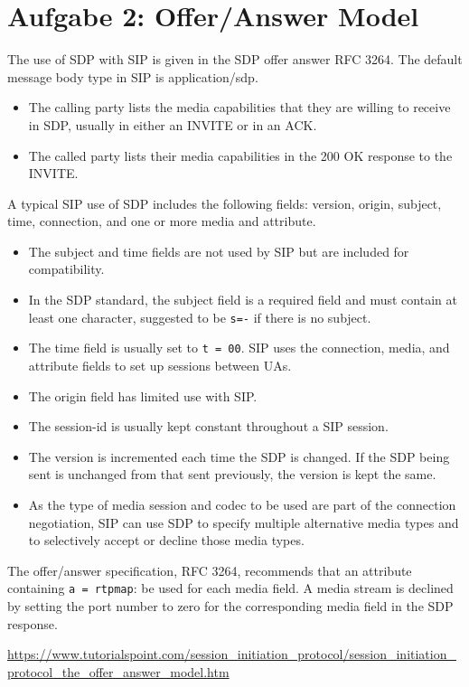 \documentclass{article}
\begin{document}
	\section*{Aufgabe 2: Offer/Answer Model}
	The use of SDP with SIP is given in the SDP offer answer RFC 3264. The default message body type in SIP is application/sdp.
	\begin{itemize}
		\item The calling party lists the media capabilities that they are willing to receive in SDP, usually in either an INVITE or in an ACK.
		\item The called party lists their media capabilities in the 200 OK response to the INVITE.
	\end{itemize}
	A typical SIP use of SDP includes the following fields: version, origin, subject, time, connection, and one or more media and attribute.
	\begin{itemize}
		\item The subject and time fields are not used by SIP but are included for compatibility.
		\item In the SDP standard, the subject field is a required field and must contain at least one character, suggested to be \texttt{s=-} if there is no subject.
		\item The time field is usually set to \texttt{t = 00}. SIP uses the connection, media, and attribute fields to set up sessions between UAs.
		\item The origin field has limited use with SIP.
		\item The session-id is usually kept constant throughout a SIP session.
		\item The version is incremented each time the SDP is changed. If the SDP being sent is unchanged from that sent previously, the version is kept the same.
		\item As the type of media session and codec to be used are part of the connection negotiation, SIP can use SDP to specify multiple alternative media types and to selectively accept or decline those media types.
	\end{itemize}
	The offer/answer specification, RFC 3264, recommends that an attribute containing \texttt{a = rtpmap}: be used for each media field. A media stream is declined by setting the port number to zero for the corresponding media field in the SDP response.
	
	\url{https://www.tutorialspoint.com/session_initiation_protocol/session_initiation_protocol_the_offer_answer_model.htm}
\end{document}
